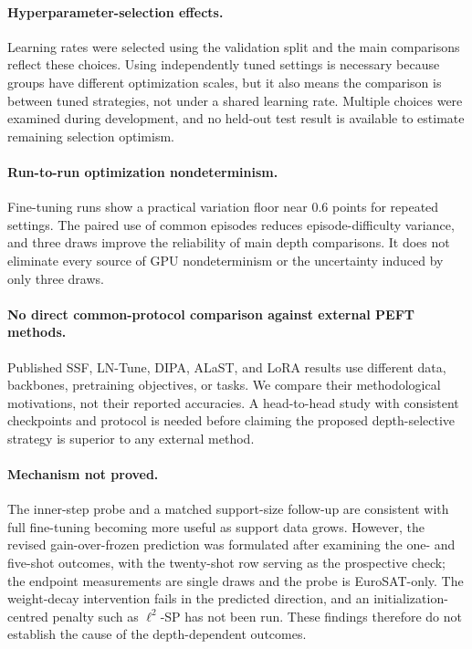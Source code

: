 \documentclass[11pt]{article}
\begin{document}
\paragraph{Hyperparameter-selection effects.} Learning rates were selected using the validation split and the main comparisons reflect these choices. Using independently tuned settings is necessary because groups have different optimization scales, but it also means the comparison is between tuned strategies, not under a shared learning rate. Multiple choices were examined during development, and no held-out test result is available to estimate remaining selection optimism.

\paragraph{Run-to-run optimization nondeterminism.} Fine-tuning runs show a practical variation floor near 0.6 points for repeated settings. The paired use of common episodes reduces episode-difficulty variance, and three draws improve the reliability of main depth comparisons. It does not eliminate every source of GPU nondeterminism or the uncertainty induced by only three draws.

\paragraph{No direct common-protocol comparison against external PEFT methods.} Published SSF, LN-Tune, DIPA, ALaST, and LoRA results use different data, backbones, pretraining objectives, or tasks. We compare their methodological motivations, not their reported accuracies. A head-to-head study with consistent checkpoints and protocol is needed before claiming the proposed depth-selective strategy is superior to any external method.

\paragraph{Mechanism not proved.} The inner-step probe and a matched support-size follow-up are consistent with full fine-tuning becoming more useful as support data grows. However, the revised gain-over-frozen prediction was formulated after examining the one- and five-shot outcomes, with the twenty-shot row serving as the prospective check; the endpoint measurements are single draws and the probe is EuroSAT-only. The weight-decay intervention fails in the predicted direction, and an initialization-centred penalty such as $\ell^2$-SP has not been run. These findings therefore do not establish the cause of the depth-dependent outcomes.
\end{document}
